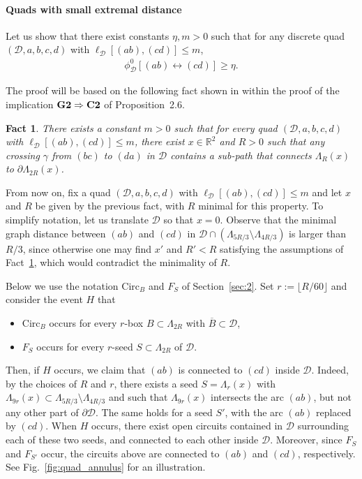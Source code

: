 \documentclass[a4paper,oneside,11pt]{article}
\newtheorem{fact}[theorem]{Fact}
\numberwithin{equation}{section}
\numberwithin{equation}{section}
\numberwithin{equation}{section}
\newcommand{\calD}{\mathcal{D}}
\newcommand{\bbR}{\mathbb{R}}
\newcommand{\La}{\Lambda}
\newcommand{\Circ}{\mathrm{Circ}}
\begin{document}
\paragraph{Quads with small extremal distance} 
Let us show that there exist constants $\eta,m >0$ such that for any discrete quad $(\calD,a,b,c,d)$ 
with $\ell_{\calD}[(ab),(cd)] \leq m$, 
\begin{align*}
	\phi_{\calD}^0[(ab)\longleftrightarrow(cd)] \geq \eta.
\end{align*}


The proof will be based on the following fact shown in \cite{KemSmi12} within the proof of the implication ${\bf G2}\Rightarrow{\bf C2}$ of Proposition~2.6.
\begin{fact}\label{fact}
	There exists a constant $m>0$ such that for every quad $(\calD,a,b,c,d)$ 
	with $\ell_{\calD}[(ab),(cd)] \leq m $, 
	there exist $x\in\bbR^2$ and $R >0$ such that any crossing $\gamma$ from $(bc)$ to $(da)$ in $\calD$ contains a sub-path that 
	connects $\La_R(x)$ to $\partial\La_{2R}(x)$.
\end{fact}
From now on, fix a quad $(\calD,a,b,c,d)$ with $\ell_{\calD}[(ab),(cd)] \leq m$ and let $x$ and $R$ be given by the previous fact, with $R$ minimal for this property. To simplify notation, let us translate $\calD$ so that $x = 0$. Observe that the minimal graph distance between $(ab)$ and $(cd)$ in $\calD\cap(\Lambda_{5R/3}\setminus\Lambda_{4R/3})$ is larger than $R/3$, since otherwise one may find $x'$ and $R'<R$ satisfying the assumptions of Fact~\ref{fact}, which would contradict the minimality of $R$. 

Below we use the notation $\Circ_B$ and $F_S$ of Section~\ref{sec:2}. Set $r:=\lfloor R/60\rfloor$ and
 consider the event $H$ that 
\begin{itemize}[nolistsep]
\item $\Circ_B$ occurs for every $r$-box $B\subset\Lambda_{2R}$ with $\overline B\subset\calD$,
\item $F_S$ occurs for every $r$-seed $S\subset\Lambda_{2R}$ of $\calD$.
\end{itemize}
Then, if $H$ occurs, we claim that $(ab)$ is connected to $(cd)$ inside $\calD$. 
Indeed, by the choices of $R$ and $r$, there exists a seed $S = \La_r(x)$ 
with $\La_{9r}(x)\subset \Lambda_{5R/3}\setminus\Lambda_{4R/3}$
and such that $\La_{9r}(x)$ intersects the arc $(ab)$, but not any other part of $\partial \calD$. 
The same holds for a seed $S'$, with the arc $(ab)$ replaced by $(cd)$. 
When $H$ occurs, there exist open circuits contained in $\calD$ surrounding each of these two seeds, and connected to each other inside $\calD$. 
Moreover, since $F_{S}$ and $F_{S'}$ occur, the circuits above are connected to $(ab)$ and $(cd)$, respectively. 
See Fig.~\ref{fig:quad_annulus} for an illustration.
  
\end{document}
